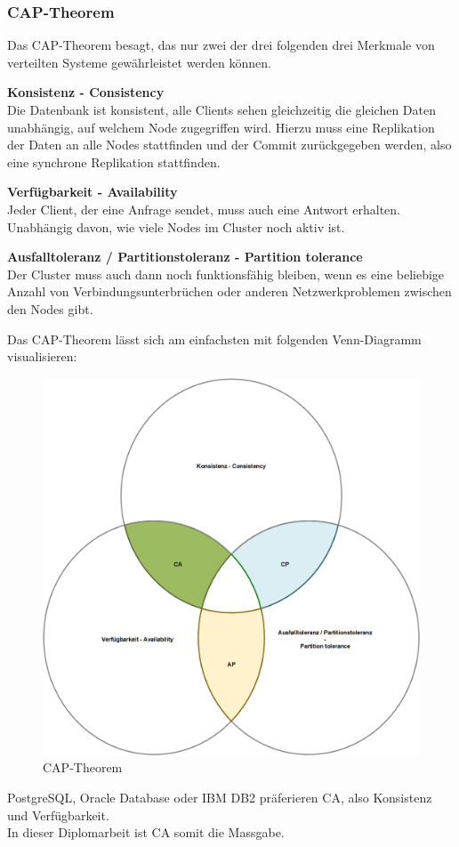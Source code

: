
\subsubsection{CAP-Theorem}
Das CAP-Theorem besagt, das nur zwei der drei folgenden drei Merkmale von verteilten Systeme gewährleistet werden können\cite{EE6EQHU2}.
\begin{flushleft}
\textbf{Konsistenz - Consistency}\\
    Die Datenbank ist konsistent, alle Clients sehen gleichzeitig die gleichen Daten unabhängig, auf welchem Node zugegriffen wird.
    Hierzu muss eine Replikation der Daten an alle Nodes stattfinden und der Commit zurückgegeben werden, also eine synchrone Replikation stattfinden.
\end{flushleft}
\begin{flushleft}
\textbf{Verfügbarkeit - Availability}\\
    Jeder Client, der eine Anfrage sendet, muss auch eine Antwort erhalten.
    Unabhängig davon, wie viele Nodes im Cluster noch aktiv ist.
\end{flushleft}
\begin{flushleft}
\textbf{Ausfalltoleranz / Partitionstoleranz - Partition tolerance}\\
    Der Cluster muss auch dann noch funktionsfähig bleiben, wenn es eine beliebige Anzahl von Verbindungsunterbrüchen oder anderen Netzwerkproblemen zwischen den Nodes gibt.
\end{flushleft}
\begin{flushleft}
    Das CAP-Theorem lässt sich am einfachsten mit folgenden Venn-Diagramm visualisieren:
    \begin{figure}[H]
        \centering
        \includegraphics[width=0.5\linewidth]{source/implementation/evaluation/excursus_architecture/cap_theorem}
        \caption{CAP-Theorem}
        \label{fig:cap_theorem}
    \end{figure}
    \Gls{PostgreSQL}, \Gls{Oracle Database} oder \Gls{IBM DB2} präferieren CA, also Konsistenz und Verfügbarkeit.\\
    In dieser Diplomarbeit ist CA somit die Massgabe.
\end{flushleft}